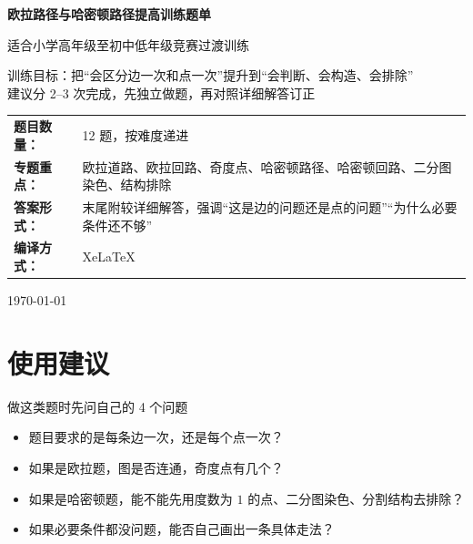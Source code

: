 \documentclass[11pt,a4paper,fontset=fandol]{ctexart}
\theoremstyle{formalexample}
\begin{document}
\thispagestyle{empty}
\begin{titlepage}
\centering
\vspace*{0.9cm}
\begin{tcolorbox}[
  enhanced,
  width=0.92\textwidth,
  colback=white,
  colframe=mainblue,
  boxrule=1pt,
  arc=0mm,
  left=6mm,
  right=6mm,
  top=8mm,
  bottom=8mm
]
\centering
{\fontsize{24}{30}\selectfont\bfseries 欧拉路径与哈密顿路径提高训练题单\par}
\vspace{0.6cm}
{\fontsize{17}{22}\selectfont 适合小学高年级至初中低年级竞赛过渡训练\par}

\vspace{1cm}
\begin{tcolorbox}[colback=lightblue,colframe=mainblue,width=0.84\textwidth,boxrule=1pt]
\centering
{\large 训练目标：把“会区分边一次和点一次”提升到“会判断、会构造、会排除”}\\[0.35em]
{\normalsize 建议分 2--3 次完成，先独立做题，再对照详细解答订正}
\end{tcolorbox}

\vspace{1cm}
\renewcommand{\arraystretch}{1.42}
\begin{tabular}{>{\bfseries}p{3.5cm}p{8cm}}
题目数量： & 12 题，按难度递进 \\
专题重点： & 欧拉道路、欧拉回路、奇度点、哈密顿路径、哈密顿回路、二分图染色、结构排除 \\
答案形式： & 末尾附较详细解答，强调“这是边的问题还是点的问题”“为什么必要条件还不够” \\
编译方式： & XeLaTeX \\
\end{tabular}

\vspace{0.9cm}
{\large \today\par}
\end{tcolorbox}
\end{titlepage}

\tableofcontents
\newpage

\section{使用建议}

\begin{goalbox}{做这类题时先问自己的 4 个问题}
\begin{itemize}
  \item 题目要求的是每条边一次，还是每个点一次？
  \item 如果是欧拉题，图是否连通，奇度点有几个？
  \item 如果是哈密顿题，能不能先用度数为 $1$ 的点、二分图染色、分割结构去排除？
  \item 如果必要条件都没问题，能否自己画出一条具体走法？
\end{itemize}
\end{goalbox}
\end{document}
